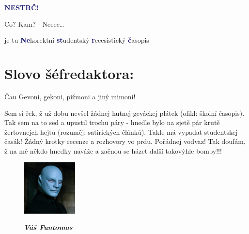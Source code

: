 \documentclass[twoside, 11pt]{article}
\begin{document}
\begin{center}
    \fontsize{40}{43}\selectfont \textcolor{MidnightBlue}{\textbf{NESTRČ!}}
 \end{center}



 \large Co? Kam? - Neeee\dots
 \begin{flushright}
    je tu \textcolor{MidnightBlue}{\textbf{Ne}}korektní \textcolor{MidnightBlue}{\textbf{st}}udentský \textcolor{MidnightBlue}{\textbf{r}}ecesistický \textcolor{MidnightBlue}{\textbf{č}}asopis
 \end{flushright}
 \section*{Slovo šéfredaktora:}
 Čau Gevoni, gekoni, pižmoni a jiný mimoni!

 Sem si řek, ž už dobu nevšel žádnej hutnej geváckej plátek (ofikl: školní
 časopis). Tak sem na to sed a upustil trochu páry - hnedle bylo na sjetě pár
 krutě žertovnejch hejtů (rozuměj: satirických článků). Takle má vypadat
 studentskej časák! Žádný krotky recenze a rozhovory vo prdu. Pořádnej
 vodvaz! Tak doufám, ž na mě někdo hnedky naváže a začnou se házet další
 takovýhle bomby!!!

 \begin{figure}
    \vspace*{-13pt}
    \includegraphics[width=0.25\textwidth]{funtomas}
    \vspace*{-23pt}
    \begin{flushright}
        \footnotesize{
        \textit{
        \textbf{Váš Funtomas}}}
    \end{flushright}
\end{figure}
\end{document}
